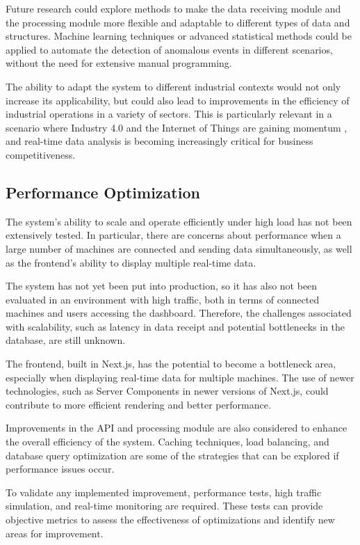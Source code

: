Future research could explore methods to make the data receiving module and the processing module more flexible and adaptable to different types of data and structures. Machine learning techniques or advanced statistical methods could be applied to automate the detection of anomalous events in different scenarios, without the need for extensive manual programming.

The ability to adapt the system to different industrial contexts would not only increase its applicability, but could also lead to improvements in the efficiency of industrial operations in a variety of sectors. This is particularly relevant in a scenario where Industry 4.0 and the Internet of Things are gaining momentum \cite{nagy2018roleImpact}, and real-time data analysis is becoming increasingly critical \cite{glowalla2014processDriven} for business competitiveness.

\subsection{Performance Optimization}

The system's ability to scale and operate efficiently under high load has not been extensively tested. In particular, there are concerns about performance when a large number of machines are connected and sending data simultaneously, as well as the frontend's ability to display multiple real-time data.

The system has not yet been put into production, so it has also not been evaluated in an environment with high traffic, both in terms of connected machines and users accessing the dashboard. Therefore, the challenges associated with scalability, such as latency in data receipt and potential bottlenecks in the database, are still unknown.

The frontend, built in Next.js, has the potential to become a bottleneck area, especially when displaying real-time data for multiple machines. The use of newer technologies, such as Server Components in newer versions of Next.js, could contribute to more efficient rendering and better performance.

Improvements in the \gls{API} and processing module are also considered to enhance the overall efficiency of the system. Caching techniques, load balancing, and database query optimization are some of the strategies that can be explored if performance issues occur.

To validate any implemented improvement, performance tests, high traffic simulation, and real-time monitoring are required. These tests can provide objective metrics to assess the effectiveness of optimizations and identify new areas for improvement.

